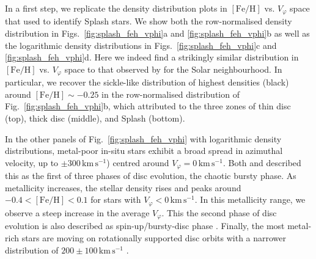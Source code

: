 \documentclass[fleqn,usenatbib]{mnras}
\begin{document}
In a first step, we replicate the density distribution plots in $\mathrm{[Fe/H]}$ vs. $V_\varphi$ space that \citet[][their Fig.~1]{Belokurov2020} used to identify Splash stars. We show both the row-normalised density distribution in Figs.~\ref{fig:splash_feh_vphi}a and \ref{fig:splash_feh_vphi}b as well as the logarithmic density distributions in Figs.~\ref{fig:splash_feh_vphi}c and \ref{fig:splash_feh_vphi}d. Here we indeed find a strikingly similar distribution in $\mathrm{[Fe/H]}$ vs. $V_\varphi$ space to that observed by \citet{Belokurov2020} for the Solar neighbourhood. In particular, we recover the sickle-like distribution of highest densities (black) around $\mathrm{[Fe/H]} \sim -0.25$ in the row-normalised distribution of Fig.~\ref{fig:splash_feh_vphi}b, which \citet{Belokurov2020} attributed to the three zones of thin disc (top), thick disc (middle), and Splash (bottom).

In the other panels of Fig.~\ref{fig:splash_feh_vphi} with logarithmic density distributions, metal-poor in-situ stars exhibit a broad spread in azimuthal velocity, up to $\pm 300\,\mathrm{km\,s^{-1}}$) centred around $V_\varphi = 0\,\mathrm{km\,s^{-1}}$. Both \citet{Yu2023b} and \citet{Chandra2024} described this as the first of three phases of disc evolution, the chaotic bursty phase. As metallicity increases, the stellar density rises and peaks around $-0.4 < \mathrm{[Fe/H]} < 0.1$ for stars with $V_\varphi < 0\,\mathrm{km\,s^{-1}}$. In this metallicity range, we observe a steep increase in the average $V_\varphi$. This the second phase of disc evolution \citep{Chandra2024} is also described as spin-up/bursty-disc phase  \citep{Yu2023b}. Finally, the most metal-rich stars are moving on rotationally supported disc orbits with a narrower distribution of $200 \pm 100\,\mathrm{km\,s^{-1}}$ \citep[the third, thin-disc phase of disc evolution in][]{Yu2023b, Chandra2024}.
\end{document}
